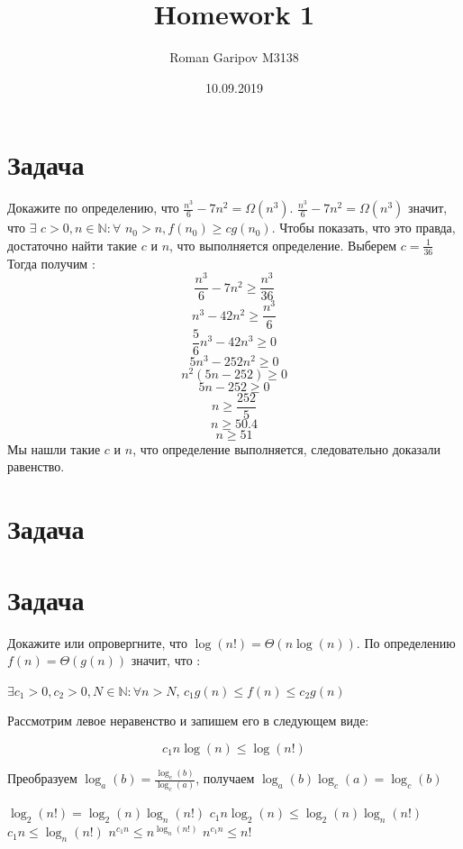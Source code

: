 \documentclass{article}
\title{Homework 1}
\date{10.09.2019}
\author{Roman Garipov M3138}
\begin{document}
  \maketitle %
  \newpage %

\section{Задача }
Докажите по определению, что 	$ \frac{n^{3}}{6} - 7n^{2} = \Omega(n^{3})$.
\newline
   $ \frac{n^{3}}{6} - 7n^{2} = \Omega(n^{3})$ значит, что $ \exists $ $c > 0,  n \in \mathbb{N}: \forall$ $n_{0} > n, f(n_{0}) \geqslant cg(n_{0})$. 
\newline
Чтобы показать, что это правда, достаточно найти такие $c$ и $n$, что выполняется определение. 
\newline	
Выберем $c = \frac{1}{36}$
\newline   
Тогда получим : $$ \frac{n^{3}}{6} - 7n^{2} \geqslant \frac{n^{3}}{36} $$
$$n^{3} - 42n^{2} \geqslant \frac{n^{3}}{6}$$
$$\frac{5}{6}n^{3} - 42n^{3} \geqslant 0$$
$$5n^{3} - 252n^{2} \geqslant 0$$
$$n^{2}(5n - 252) \geqslant 0$$ 
$$5n - 252 \geqslant 0$$
$$n \geqslant \frac{252}{5}$$ 
$$n \geqslant 50.4$$
$$n \geqslant 51$$
Мы нашли такие $c$ и $n$, что определение выполняется, следовательно доказали равенство.
      
\section{Задача }


\section{Задача }
Докажите или опровергните, что $\log(n!) = \Theta(n\log(n))$.
\newline
По определению $f(n) = \Theta(g(n))$ значит, что :
\begin{center}
$\exists  c_{1} > 0, c_{2} > 0, N \in \mathbb{N} : \forall n > N$,  $c_{1}g(n) \leq f(n) \leq c_{2}g(n)$
\end{center}
\begin{center}
Рассмотрим левое неравенство и запишем его в следующем виде:
\end{center}
$$c_{1}n\log(n) \leq \log(n!)$$
\begin{center}
Преобразуем
$\log_{a}(b) = \frac{\log_{c}(b)}{\log_{c}(a)}$, получаем $\log_{a}(b)\log_{c}(a) = \log_{c}(b)$

$\log_{2}(n!) = \log_{2}(n)\log_{n}(n!)$
\newline
$c_{1}n\log_{2}(n) \leq \log_{2}(n)\log_{n}(n!)$
\newline
$c_{1}n \leq \log_{n}(n!)$
\newline
$n^{c_{1}n} \leq n^{\log_{n}(n!)}$
\newline
$n^{c_{1}n} \leq n!$
\end{center}
\end{document}
